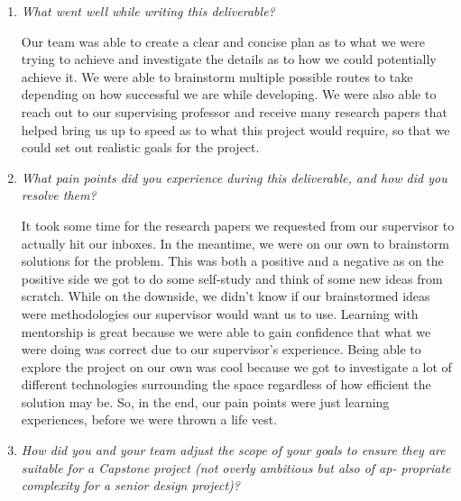 \documentclass{article}
\begin{document}
\begin{enumerate}
    \item \textit{What went well while writing this deliverable?}
    
    Our team was able to create a clear and concise plan as to what we were trying to achieve and investigate the details as to how we could potentially achieve it. We were able to brainstorm multiple possible routes to take depending on how successful we are while developing. We were also able to reach out to our supervising professor and receive many research papers that helped bring us up to speed as to what this project would require, so that we could set out realistic goals for the project.
    \item \textit{What pain points did you experience during this deliverable, and how did you resolve them?}
    
    It took some time for the research papers we requested from our supervisor to actually hit our inboxes. In the meantime, we were on our own to brainstorm solutions for the problem. This was both a positive and a negative as on the positive side we got to do some self-study and think of some new ideas from scratch. While on the downside, we didn’t know if our brainstormed ideas were methodologies our supervisor would want us to use. Learning with mentorship is great because we were able to gain confidence that what we were doing was correct due to our supervisor’s experience. Being able to explore the project on our own was cool because we got to investigate a lot of different technologies surrounding the space regardless of how efficient the solution may be. So, in the end, our pain points were just learning experiences, before we were thrown a life vest.
    

    \item \textit{How did you and your team adjust the scope of your goals to ensure they
    are suitable for a Capstone project (not overly ambitious but also of ap-
    propriate complexity for a senior design project)?}


\end{enumerate}
\end{document}
